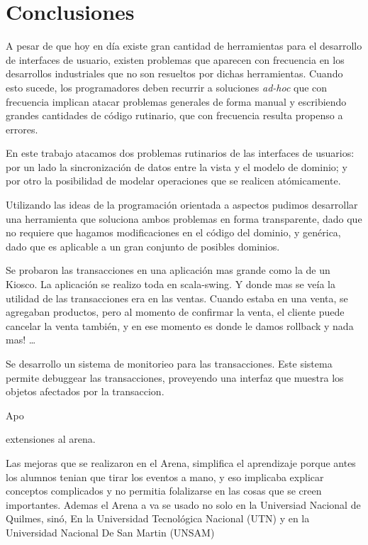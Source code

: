 \section{Conclusiones}
\label{sec:conclusions}
A pesar de que hoy en día existe gran cantidad de herramientas para el
desarrollo de interfaces de usuario, existen problemas que
aparecen con frecuencia en los desarrollos industriales que no son resueltos por
dichas herramientas.
 Cuando esto sucede, los programadores deben recurrir a soluciones \emph{ad-hoc}
que con frecuencia implican atacar problemas generales de forma manual y
escribiendo grandes cantidades de código rutinario, que con frecuencia resulta
propenso a errores.

En este trabajo atacamos dos problemas rutinarios de las interfaces de usuarios:
por un lado la sincronización de datos entre la vista y el modelo de dominio; y
por otro la posibilidad de modelar operaciones que se realicen atómicamente.

Utilizando las ideas de la programación orientada a aspectos pudimos desarrollar
una herramienta que soluciona ambos problemas en forma transparente, dado que no
requiere que hagamos modificaciones en el código del dominio, y genérica, dado
que es aplicable a un gran conjunto de posibles dominios.



Se probaron las transacciones en una aplicación mas grande como la de un
Kiosco.
La aplicación se realizo toda en scala-swing. Y donde mas se veía la utilidad de
las transacciones era en las ventas. Cuando estaba en una venta, se agregaban
productos, pero al momento de confirmar la venta, el cliente puede cancelar la
venta también, y en ese momento es donde le damos rollback y nada mas! \ldots
{}

Se desarrollo un sistema de monitorieo para las transacciones. Este sistema
permite debuggear las transacciones, proveyendo una interfaz que muestra los
objetos afectados por la transaccion.

Apo

extensiones al arena.

Las mejoras que se realizaron en el Arena, simplifica el aprendizaje porque
antes los alumnos tenian que tirar los eventos a mano, y eso implicaba explicar
conceptos complicados y no permitia folalizarse en las cosas que se creen importantes.
Ademas el Arena a va se usado no solo en la Universiad Nacional de Quilmes,
sinó, En la Universidad Tecnológica Nacional (UTN) y en la Universidad Nacional
De San Martin (UNSAM)
